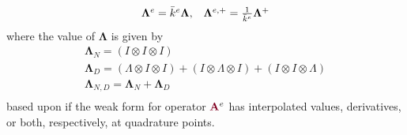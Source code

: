 \begin{definition}
\begin{equation}
\begin{array}{c c}
\mathbf{\Lambda}^e = \bar{k}^e \mathbf{\Lambda},  &  \mathbf{\Lambda}^{e, +} = \frac{1}{\bar{k}^e} \mathbf{\Lambda}^{+}
\end{array}
\end{equation}
where the value of $\mathbf{\Lambda}$ is given by
\begin{equation}
\begin{array}{c}
\mathbf{\Lambda}_N      = \left( I \otimes I \otimes I \right)  \\
\mathbf{\Lambda}_D      = \left( \Lambda \otimes I \otimes I\right) + \left( I \otimes \Lambda \otimes I\right) + \left( I \otimes I \otimes \Lambda \right)  \\
\mathbf{\Lambda}_{N, D} = \mathbf{\Lambda}_N + \mathbf{\Lambda}_D  \\
\end{array}
\end{equation}
based upon if the weak form for operator ${\color{burgundy}\mathbf{A}}^e$ has interpolated values, derivatives, or both, respectively, at quadrature points.
\end{definition}
